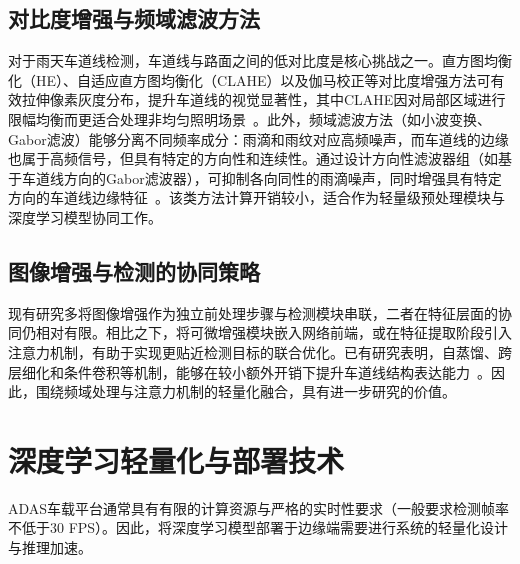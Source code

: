 \subsection{对比度增强与频域滤波方法}
对于雨天车道线检测，车道线与路面之间的低对比度是核心挑战之一。直方图均衡化（HE）、自适应直方图均衡化（CLAHE）以及伽马校正等对比度增强方法可有效拉伸像素灰度分布，提升车道线的视觉显著性，其中CLAHE因对局部区域进行限幅均衡而更适合处理非均匀照明场景~\cite{zuiderveld1994clahe}。此外，频域滤波方法（如小波变换、Gabor滤波）能够分离不同频率成分：雨滴和雨纹对应高频噪声，而车道线的边缘也属于高频信号，但具有特定的方向性和连续性。通过设计方向性滤波器组（如基于车道线方向的Gabor滤波器），可抑制各向同性的雨滴噪声，同时增强具有特定方向的车道线边缘特征~\cite{dunn1995gabor}。该类方法计算开销较小，适合作为轻量级预处理模块与深度学习模型协同工作。

\subsection{图像增强与检测的协同策略}
现有研究多将图像增强作为独立前处理步骤与检测模块串联，二者在特征层面的协同仍相对有限。相比之下，将可微增强模块嵌入网络前端，或在特征提取阶段引入注意力机制，有助于实现更贴近检测目标的联合优化。已有研究表明，自蒸馏、跨层细化和条件卷积等机制，能够在较小额外开销下提升车道线结构表达能力~\cite{hou2019sad,liu2021,zheng2022clrnet}。因此，围绕频域处理与注意力机制的轻量化融合，具有进一步研究的价值。

\section{深度学习轻量化与部署技术}
\label{sec:deep_learning_lightweight}
ADAS车载平台通常具有有限的计算资源与严格的实时性要求（一般要求检测帧率不低于30 FPS）。因此，将深度学习模型部署于边缘端需要进行系统的轻量化设计与推理加速。

